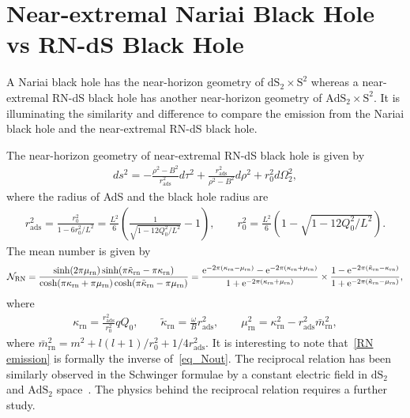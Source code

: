 \documentclass[aps,nofootinbib,superscriptaddress
]{revtex4}
\begin{document}
\section{Near-extremal Nariai Black Hole vs RN-dS Black Hole} \label{sec IV}
A Nariai black hole has the near-horizon geometry of $\mathrm{dS}_2 \times \mathrm{S}^2$ whereas a near-extremal RN-dS black hole has another near-horizon geometry of $\mathrm{AdS}_2 \times \mathrm{S}^2$. It is illuminating the similarity and difference to compare the emission from the Nariai black hole and the near-extremal RN-dS black hole.

The near-horizon geometry of near-extremal RN-dS black hole is given by~\cite{Chen:2020mqs}
\begin{eqnarray}
ds^2 = - \frac{\rho^2 - B^2}{r_{\mathrm{ads}}^2} d \tau^2 + \frac{r_{\mathrm{ads}}^2}{\rho^2 - B^2} d\rho^2 + r_0^2 d \Omega_2^2,
\end{eqnarray}
where the radius of AdS and the black hole radius are
\begin{eqnarray} \label{RN-radii}
r_\mathrm{ads}^2 = \frac{r_0^2}{1 - 6 r_0^2/L^2} = \frac{L^2}{6} \left( \frac{1}{\sqrt{1 - 12 Q_0^2/L^2}} - 1 \right), \qquad r_0^2 = \frac{L^2}{6} \left( 1 - \sqrt{1 - 12 Q_0^2/L^2} \right).
\end{eqnarray}
The mean number is given by
\begin{eqnarray} \label{RN emission}
{\cal N}_{\mathrm{RN}} = \frac{\sinh(2 \pi \mu_\mathrm{rn}) \sinh(\pi \tilde{\kappa}_\mathrm{rn} - \pi \kappa_\mathrm{rn})}{\cosh(\pi \kappa_\mathrm{rn} + \pi \mu_\mathrm{rn}) \cosh(\pi \tilde{\kappa}_\mathrm{rn} - \pi \mu_\mathrm{rn})}
= \frac{\mathrm{e}^{- 2 \pi (\kappa_\mathrm{rn} - \mu_\mathrm{rn})} - \mathrm{e}^{- 2 \pi (\kappa_\mathrm{rn} + \mu_\mathrm{rn})} }{1 + \mathrm{e}^{- 2 \pi (\kappa_\mathrm{rn} + \mu_\mathrm{rn})}}
\times \frac{1 - \mathrm{e}^{- 2 \pi (\tilde{\kappa}_\mathrm{rn} - \kappa_\mathrm{rn})}}{1 + \mathrm{e}^{- 2 \pi (\tilde{\kappa}_\mathrm{rn} - \mu_\mathrm{rn})}},
\end{eqnarray}
where
\begin{eqnarray}
\kappa_\mathrm{rn} = \frac{r_{\mathrm{ads}}^2}{r_0^2} q Q_0, \qquad \tilde{\kappa}_\mathrm{rn} = \frac{\omega}{B} r_{\mathrm{ads}}^2, \qquad \mu_\mathrm{rn}^2 = \kappa_\mathrm{rn}^2 - r_{\mathrm{ads}}^2 \bar{m}_\mathrm{rn}^2,
\end{eqnarray}
where $\bar{m}_\mathrm{rn}^2 = m^2 + l(l + 1)/r_0^2 + 1/4 r_\mathrm{ads}^2$. It is interesting to note that~\eqref{RN emission} is formally the inverse of~\eqref{eq_Nout}. The reciprocal relation has been similarly observed in the Schwinger formulae by a constant electric field in $\mathrm{dS}_2$ and $\mathrm{AdS}_2$ space~\cite{Kim:2022nsx}. The physics behind the reciprocal relation requires a further study.
\end{document}
